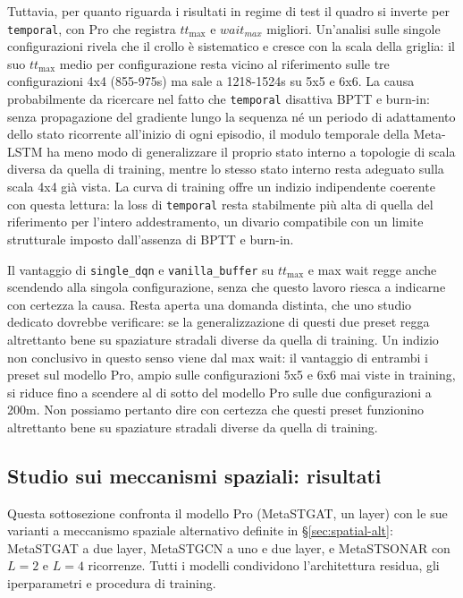 Tuttavia, per quanto riguarda i risultati in regime di test
il quadro si inverte per \texttt{temporal}, con Pro che registra $tt_{\max}$ e $wait_{max}$ migliori.
Un'analisi sulle singole configurazioni rivela che il crollo è sistematico
e cresce con la scala della griglia: il suo $tt_{\max}$ medio per
configurazione resta vicino al riferimento sulle tre configurazioni 4x4
(855-975s) ma sale a 1218-1524s su 5x5 e 6x6.
La causa probabilmente da ricercare nel fatto che \texttt{temporal} disattiva BPTT e burn-in: senza propagazione del gradiente
lungo la sequenza né un periodo di adattamento dello stato ricorrente
all'inizio di ogni episodio, il modulo temporale della Meta-LSTM ha meno
modo di generalizzare il proprio stato interno a topologie di scala
diversa da quella di training, mentre lo stesso stato interno resta
adeguato sulla scala 4x4 già vista. La curva di training offre un
indizio indipendente coerente con questa lettura: la loss di
\texttt{temporal} resta stabilmente più alta di quella del riferimento
per l'intero addestramento, un divario compatibile con
un limite strutturale imposto dall'assenza di BPTT e burn-in.

Il vantaggio di \texttt{single\_dqn} e \texttt{vanilla\_buffer} su
$tt_{\max}$ e max wait regge anche scendendo alla singola configurazione,
senza che questo lavoro riesca a indicarne con certezza la causa. Resta
aperta una domanda distinta, che uno studio dedicato dovrebbe verificare:
se la generalizzazione di questi due preset regga altrettanto bene su
spaziature stradali diverse da quella di training. Un indizio non
conclusivo in questo senso viene dal max wait: il vantaggio di entrambi i
preset sul modello Pro, ampio sulle configurazioni 5x5 e 6x6
mai viste in training, si riduce fino a scendere al di sotto del modello Pro sulle due configurazioni
a 200m. Non possiamo pertanto dire con certezza che questi preset funzionino altrettanto bene su spaziature stradali diverse da quella di training.

\subsection{Studio sui meccanismi spaziali: risultati}
\label{sec:confronto-spaziale}

Questa sottosezione confronta il modello Pro (MetaSTGAT, un layer)
con le sue varianti a meccanismo spaziale alternativo definite in
§\ref{sec:spatial-alt}: MetaSTGAT a due layer, MetaSTGCN a uno e due
layer, e MetaSTSONAR con $L=2$ e $L=4$ ricorrenze. Tutti i modelli
condividono l'architettura residua, gli iperparametri e procedura di training.


